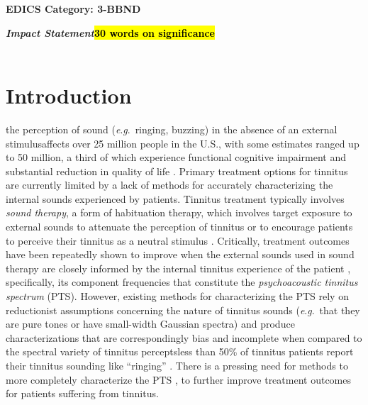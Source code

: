 \documentclass[journal]{IEEEtran}
\newcommand{\eg}{\textit{e}.\textit{g}.\ }
\begin{document}
\ifCLASSOPTIONpeerreview
\begin{center} \bfseries EDICS Category: 3-BBND \end{center}
\fi
%
\IEEEpeerreviewmaketitle

\begin{minipage}[t]{1\columnwidth}
\textbf{\textit{Impact Statement}\textemdash{}\hl{30 words on significance}}\\
\\
\end{minipage}

\section{Introduction}

\textemdash{}the perception of sound (\eg ringing, buzzing)
in the absence of an external stimulus\textemdash{}affects over 25 million people in the U.S.,
with some estimates ranged up to 50 million,
a third of which experience functional cognitive impairment and substantial reduction
in quality of life \cite{henryTinnitusEpidemiologicPerspective2020,vajsakovicPrinciplesMethodsPsychoacoustic2021}.
Primary treatment options for tinnitus are currently limited by a lack of methods
for accurately characterizing the internal sounds experienced by patients.
Tinnitus treatment typically involves \textit{sound therapy}, a form of habituation therapy,
which involves target exposure to external sounds to attenuate the perception of tinnitus
or to encourage patients to perceive their tinnitus as a neutral stimulus
\cite{jastreboff25YearsTinnitus2015}.
Critically, treatment outcomes have been repeatedly shown to improve
when the external sounds used in sound therapy are closely informed
by the internal tinnitus experience of the patient
\cite{steinInhibitioninducedPlasticityTinnitus2015,tassCounteractingTinnitusAcoustic2012,okamotoListeningTailormadeNotched2010,davisNeuromonicsTinnitusTreatment2007},
specifically, its component frequencies that constitute
the \textit{psychoacoustic tinnitus spectrum} (PTS).
However, existing methods for characterizing the PTS rely on reductionist assumptions
concerning the nature of tinnitus sounds (\eg that they are pure tones or have small-width Gaussian spectra)
and produce characterizations that are correspondingly bias and incomplete
when compared to the spectral variety of tinnitus percepts\textemdash{}less than
50\% of tinnitus patients
report their tinnitus sounding like ``ringing'' \cite{vajsakovicPrinciplesMethodsPsychoacoustic2021}.
There is a pressing need for methods to more completely characterize the PTS
\cite{henryTinnitusEpidemiologicPerspective2020,henryMeasurementTinnitus2016,norenaPsychoacousticCharacterizationTinnitus2002},
to further improve treatment outcomes for patients suffering from tinnitus.
\end{document}
